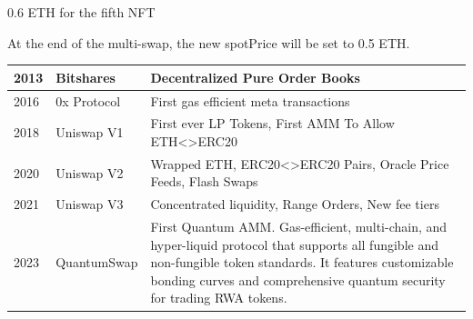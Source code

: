 \documentclass[11pt]{article}
\begin{document}
0.6 ETH for the fifth NFT


At the end of the multi-swap, the new spotPrice will be set to 0.5 ETH.


\begin{table}[htbp]
\centering
\begin{tabular}{l|l|l}
\toprule
2013 & Bitshares & Decentralized Pure Order Books \\
\midrule
2016 & 0x Protocol & First gas efficient meta transactions \\
2018 & Uniswap V1 & First ever LP Tokens,  
First AMM To Allow ETH<>ERC20 \\
2020 & Uniswap V2 & Wrapped ETH, ERC20<>ERC20 Pairs, Oracle Price Feeds, Flash Swaps \\
2021 & Uniswap V3 & Concentrated liquidity, Range Orders, New fee tiers \\
2023 & QuantumSwap & First Quantum AMM. Gas-efficient, multi-chain, and hyper-liquid protocol that supports all fungible and non-fungible token standards. It features customizable bonding curves and comprehensive quantum security for trading RWA tokens. \\
\bottomrule
\end{tabular}
\end{table}
\end{document}

